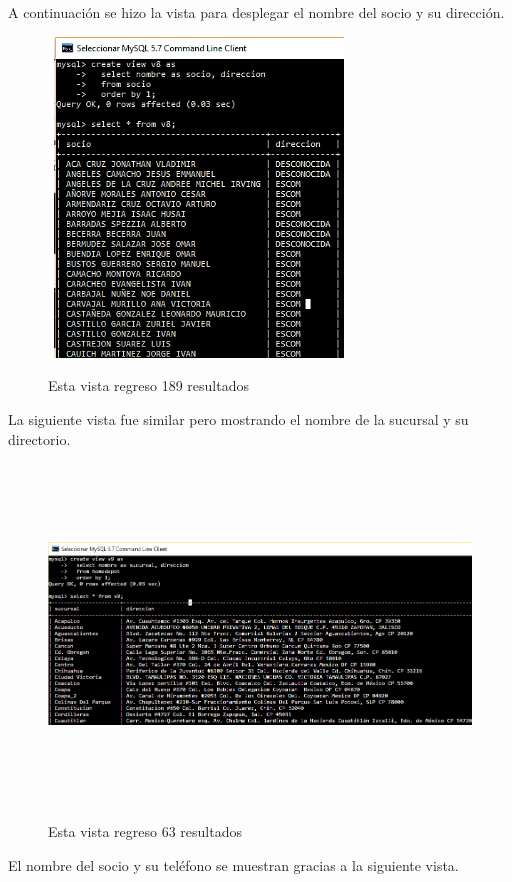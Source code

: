 \documentclass[12pt, titlepage]{article}
\begin{document}
	A continuación se hizo la vista para desplegar el nombre del socio y su dirección.
	\begin{figure}[H]
		\begin{center}
			\includegraphics[width=8cm, height=8.5cm]{img/v8.png}
			\label{fig:v8}
			\caption{Esta vista regreso 189 resultados}
		\end{center}
	\end{figure}
	La siguiente vista fue similar pero mostrando el nombre de la sucursal y su directorio.
	\begin{figure}[H]
		\begin{center}
			\includegraphics[width=16cm, height=9cm]{img/v9.png}
			\label{fig:v9}
			\caption{Esta vista regreso 63 resultados}
		\end{center}
	\end{figure}
	El nombre del socio y su teléfono se muestran gracias a la siguiente vista.
\end{document}
